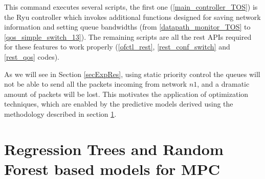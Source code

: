 This command executes several scripts, the first one (\ref{main_controller_TOS}) is the Ryu controller which invokes additional functions designed for saving network information and setting queue bandwidths (from \ref{datapath_monitor_TOS} to \ref{qos_simple_switch_13}). The remaining scripts are all the rest APIs required for these features to work properly (\ref{ofctl_rest}, \ref{rest_conf_switch} and \ref{rest_qos} codes).

As we will see in Section \ref{secExpRes}, using static priority control the queues will not be able to send all the packets incoming from network $n1$, and a dramatic amount of packets will be lost. This motivates the application of optimization techniques, which are enabled by the predictive models derived using the methodology described in section \ref{secSwitchedModeling}.

\section{Regression Trees and Random Forest based models for MPC}\label{secSwitchedModeling}

